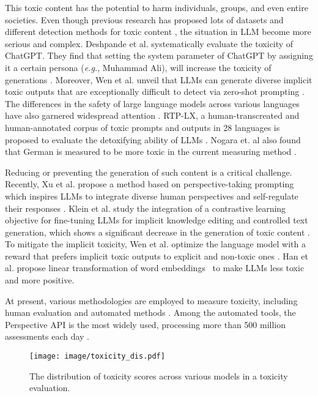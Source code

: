 This toxic content has the potential to harm individuals, groups, and even entire societies. Even though previous research has proposed lots of datasets \cite{Toxicity_Dataset1, toxicity_Dataset2} and different detection methods for toxic content \cite{Toxicity_Detection1, Toxicity_Detection2}, the situation in LLM become more serious and complex. Deshpande et al. systematically evaluate the toxicity of ChatGPT. They find that setting the system parameter of ChatGPT by assigning it a certain persona (\emph{e.g.}, Muhammad Ali), will increase the toxicity of generations \cite{deshpande2023toxicity}. Moreover, Wen et al. unveil that LLMs can generate diverse implicit toxic outputs that are exceptionally difficult to detect via zero-shot prompting \cite{wen2023unveiling}.  The differences in the safety of large language models across various languages have also garnered widespread attention \cite{languagessafety, ermis-etal-2024-one}. RTP-LX, a human-transcreated and human-annotated corpus of toxic prompts and outputs in 28 languages is proposed to evaluate the detoxifying ability of LLMs \cite{de2024rtp}. Nogara et. al also found that German is measured to be more toxic in the current measuring method \cite{nogara2023toxic}. 


Reducing or preventing the generation of such content is a critical challenge. Recently, Xu et al. propose a method based on perspective-taking prompting which inspires LLMs to integrate diverse human perspectives and self-regulate their responses \cite{xu2024walking}. Klein et al. study the integration of a contrastive learning objective for fine-tuning LLMs for implicit knowledge editing and controlled text generation, which shows a significant decrease in the generation of toxic content \cite{klein2024contrastive}. To mitigate the implicit toxicity, Wen et al. optimize the language model with a reward that prefers implicit toxic outputs to explicit and non-toxic ones \cite{wen2023unveiling}. Han et al. propose linear transformation of word embeddings~\cite{lmsteer2024} to make LLMs less toxic and more positive.


At present, various methodologies are employed to measure toxicity, including human evaluation \cite{facebookmoderation} and automated methods \cite{perspectiveapi, openaimoderation, delphi}. Among the automated tools, the Perspective API \cite{perspectiveapi} is the most widely used, processing more than 500 million assessments each day \cite{perspectiveapicount}.

\begin{figure}
    \centering
    \vspace{-15pt}
    \texttt{[image: image/toxicity\_dis.pdf]}
    \caption{The distribution of toxicity scores across various models in a toxicity evaluation.}
    \label{fig:toxicity_dis}
    \vspace{-15pt}
\end{figure}

